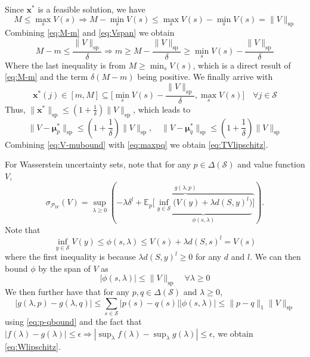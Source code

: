     Since $\mathbf{x^*}$ is a feasible solution, we have
    \begin{equation} \label{eq:Vspan}
        M \leq \max_s V(s) \Rightarrow M-\min_sV(s) \leq \max_s V(s) -\min_sV(s) =\|V\|_{\mathrm{sp}}
    \end{equation}
    Combining \eqref{eq:M-m} and \eqref{eq:Vspan} we obtain
    \begin{equation}
        M-m\leq\frac{\|V\|_{\mathrm{sp}}}{\delta} \Rightarrow m \geq M - \frac{\|V\|_{\mathrm{sp}}}{\delta} \geq \min_sV(s) - \frac{\|V\|_{\mathrm{sp}}}{\delta}
    \end{equation}
    Where the last inequality is from $M \geq \min_sV(s)$, which is a direct result of \eqref{eq:M-m} and the term $\delta(M-m)$ being positive. We finally arrive with
    \begin{equation}
        \mathbf{x}^*(j) \in [m,M] \subseteq \Big[\min_sV(s) - \frac{\|V\|_{\mathrm{sp}}}{\delta} , \max_sV(s) \Big] \quad \forall j \in \mathcal{S}
    \end{equation}
    Thus, $\|\mathbf{x}^*\|_{\mathrm{sp}} \leq (1+\frac{1}{\delta})\|V\|_{\mathrm{sp}}$, which leads to 
    \begin{equation} \label{eq:V-mubound}
        \|V-\mathbf{\mu}_p^*\|_{\mathrm{sp}} \leq (1+\frac{1}{\delta})\|V\|_{\mathrm{sp}}, \quad \|V-\mathbf{\mu}_q^*\|_{\mathrm{sp}} \leq (1+\frac{1}{\delta})\|V\|_{\mathrm{sp}}
    \end{equation}
    Combining \eqref{eq:V-mubound} with \eqref{eq:maxpq} we obtain \eqref{eq:TVlipschitz}.

    For Wasserstein uncertainty sets, note that for any $p \in \Delta(\mathcal{S})$ and value function $V$,
    \begin{equation}
        \sigma_{\mathcal{P}_{W}}(V) = \sup_{\lambda\geq 0}\left(\overbrace{-\lambda\delta^l+\mathbb{E}_{p}\big[\underbrace{\inf_{y\in\mathcal{S}}\big(V(y)+\lambda d(S,y)^l \big)}_{\phi(s,\lambda)}\big]}^{g(\lambda,p)} \right).    
    \end{equation}
    Note that
    \begin{equation}
        \inf_{y\in\mathcal{S}}V(y) \leq \phi(s,\lambda) \leq V(s)+\lambda d(S,s)^l = V(s)
    \end{equation}
    where the first inequality is because $\lambda d(S,y)^l\geq0$ for any $d$ and $l$. We can then bound $\phi$ by the span of $V$ as
    \begin{equation} 
        |\phi(s,\lambda)| \leq \|V\|_{\mathrm{sp}} \quad \forall \lambda \geq 0
    \end{equation}
    We then further have that for any $p,q\in \Delta(\mathcal{S})$ and $\lambda\geq0$,
    \begin{equation} \label{eq:p-qbound}
        |g(\lambda,p)-g(\lambda,q)| \leq \sum_{s\in\mathcal{S}} |p(s)-q(s)||\phi(s,\lambda)| \leq \|p-q\|_1 \|V\|_{\mathrm{sp}}
    \end{equation}
    using \eqref{eq:p-qbound} and the fact that $|f(\lambda)-g(\lambda)| \leq \epsilon \Rightarrow |\sup_\lambda f(\lambda) - \sup_\lambda g(\lambda)| \leq \epsilon$, we obtain \eqref{eq:Wlipschitz}.

